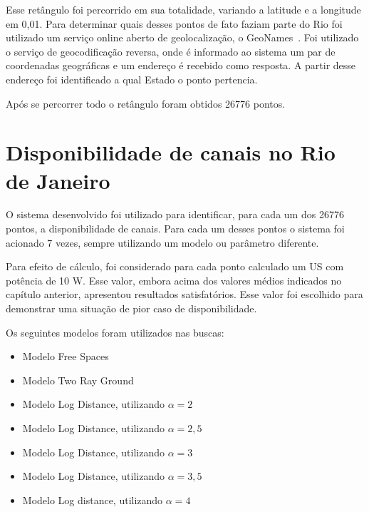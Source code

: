 \FloatBarrier

Esse retângulo foi percorrido em sua totalidade, variando a latitude e a longitude em 0,01. Para determinar quais desses pontos de fato faziam parte do Rio foi utilizado um serviço online aberto de geolocalização, o GeoNames~\cite{geoloc}.  Foi utilizado o serviço de geocodificação reversa, onde é informado ao sistema um par de coordenadas geográficas e um endereço é recebido como resposta. A partir desse endereço foi identificado a qual Estado o ponto pertencia.

Após se percorrer todo o retângulo foram obtidos 26776 pontos.

\section{Disponibilidade de canais no Rio de Janeiro}

 O sistema desenvolvido foi utilizado para identificar, para cada um dos 26776 pontos, a disponibilidade de canais. Para cada um desses pontos o sistema foi acionado 7 vezes, sempre utilizando um modelo ou parâmetro diferente. 

Para efeito de cálculo, foi considerado para cada ponto calculado um US com potência de 10 W. Esse valor, embora acima dos valores médios indicados no capítulo anterior, apresentou resultados satisfatórios. Esse valor foi escolhido para demonstrar uma situação de pior caso de disponibilidade.

Os seguintes modelos foram utilizados nas buscas:

\begin{itemize}
\item Modelo Free Spaces
\item Modelo Two Ray Ground
\item Modelo Log Distance, utilizando \begin{math}\alpha=2 \end{math}
\item Modelo Log Distance, utilizando \begin{math}\alpha=2,5 \end{math}
\item Modelo Log Distance, utilizando \begin{math}\alpha=3 \end{math}
\item Modelo Log Distance, utilizando \begin{math}\alpha=3,5 \end{math}
\item Modelo Log distance, utilizando \begin{math}\alpha=4 \end{math}
\end{itemize}


